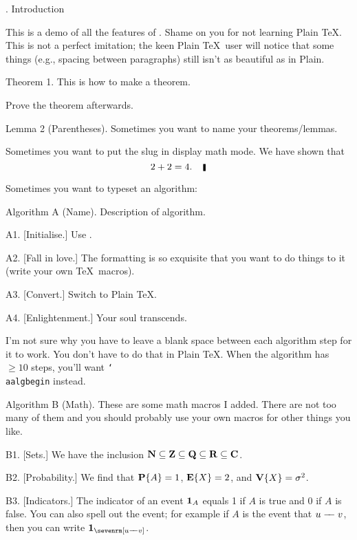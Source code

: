 \documentclass[10pt]{article}
\begin{document}

. Introduction

This is a demo of all the features of \GohLaTeX. Shame on you for not learning Plain \TeX. This
is not a perfect imitation; the keen Plain \TeX\ user will notice that some things (e.g., spacing
between paragraphs) still isn't as beautiful as in Plain.

\proclaim Theorem 1. This is how to make a theorem.

\proof Prove the theorem afterwards.\slug

\parenproclaim Lemma 2 (Parentheses). Sometimes you want to name your theorems/lemmas.

\solution Sometimes you want to put the slug in display math mode. We have shown that
$$2+2 = 4.\noskipslug$$

Sometimes you want to typeset an algorithm:

\algbegin Algorithm A (Name). Description of algorithm.

\algstep A1. [Initialise.] Use \GohLaTeX.

\algstep A2. [Fall in love.] The formatting is so exquisite that you want to do things to it (write
your own \TeX\ macros).

\algstep A3. [Convert.] Switch to Plain \TeX.

\algstep A4. [Enlightenment.] Your soul transcends.\slug

I'm not sure why you have to leave a blank space between each algorithm step for it to work. You don't have
to do that in Plain \TeX. When the algorithm has $\geq 10$ steps, you'll want {\tt \char`\\aalgbegin} instead.

\aalgbegin Algorithm B (Math). These are some math macros I added. There are not too many of them and you
should probably use your own macros for other things you like.

\algstep B1. [Sets.] We have the inclusion ${\bf N}\subseteq {\bf Z} \subseteq {\bf Q}\subseteq  {\bf R}\subseteq  {\bf C}$.

\algstep B2. [Probability.] We find that $\mathop{\hbox{\bf P}}\nolimits\{A\} = 1$, $\mathop{\hbox{\bf E}}\nolimits\{X\} = 2$, and $\mathop{\hbox{\bf V}}\nolimits\{X\} = \sigma^2$.

\algstep B3. [Indicators.] The indicator of an event $\mathop{\hbox{\bf 1}}\nolimits_A$ equals 1 if $A$ is true and 0 if $A$ is false.
You can also spell out the event; for example if $A$ is the event that $u\mathrel-\!\!\mathrel- v$, then you can
write $\indic{u\edge v}$.
\end{document}
